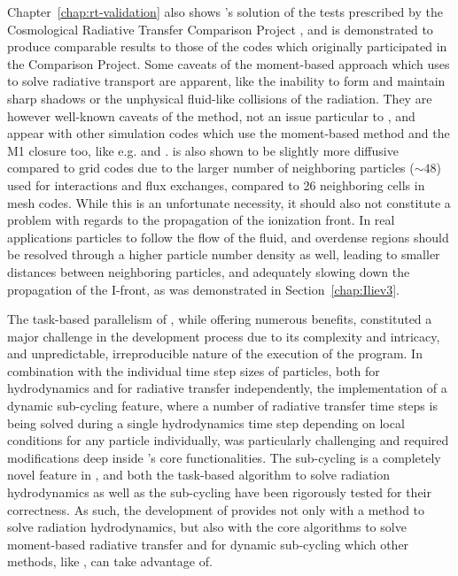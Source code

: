 Chapter~\ref{chap:rt-validation} also shows \GEARRT's solution of the tests prescribed by the
Cosmological Radiative Transfer Comparison Project \citep{ilievCosmologicalRadiativeTransfer2006,
ilievCosmologicalRadiativeTransfer2009}, and \GEARRT is demonstrated to produce comparable results
to those of the codes which originally participated in the Comparison Project. Some caveats of the
moment-based approach which \GEARRT uses to solve radiative transport are apparent, like the
inability to form and maintain sharp shadows or the unphysical fluid-like collisions of the
radiation. They are however well-known caveats of the method, not an issue particular to \GEARRT,
and appear with other simulation codes which use the moment-based method and the M1 closure
too, like e.g. \citet{ramses-rt13} and \citet{kannanAREPORTRadiationHydrodynamics2019}. \GEARRT is
also shown to be slightly more diffusive compared to grid codes due to the larger number of
neighboring particles ($\sim 48$) used for interactions and flux exchanges, compared to 26
neighboring cells in mesh codes. While this is an unfortunate necessity, it should also not
constitute a problem with regards to the propagation of the ionization front. In real applications
particles to follow the flow of the fluid, and overdense regions should be resolved through a higher
particle number density as well, leading to smaller distances between neighboring particles, and
adequately slowing down the propagation of the I-front, as was demonstrated in
Section~\ref{chap:Iliev3}.


The task-based parallelism of \swift, while offering numerous benefits, constituted a major
challenge in the development process due to its complexity and intricacy, and unpredictable,
irreproducible nature of the execution of the program. In combination with the individual time step
sizes of particles, both for hydrodynamics and for radiative transfer independently, the
implementation of a dynamic sub-cycling feature, where a number of radiative transfer time steps is
being solved during a single hydrodynamics time step depending on local conditions for any particle
individually, was particularly challenging and required modifications deep inside \swift's core
functionalities. The sub-cycling is a completely novel feature in \swift, and both the task-based
algorithm to solve radiation hydrodynamics as well as the sub-cycling have been rigorously tested
for their correctness. As such, the development of \GEARRT provides \swift not only with a method to
solve radiation hydrodynamics, but also with the core algorithms to solve moment-based radiative
transfer and for dynamic sub-cycling which other methods, like 
\citep{chanSmoothedParticleRadiation2021}, can take advantage of.

